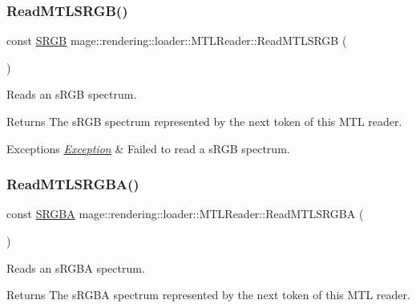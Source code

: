 \subsubsection{\texorpdfstring{Read\+M\+T\+L\+S\+R\+G\+B()}{ReadMTLSRGB()}}
{\footnotesize\ttfamily const \mbox{\hyperlink{structmage_1_1_s_r_g_b}{S\+R\+GB}} mage\+::rendering\+::loader\+::\+M\+T\+L\+Reader\+::\+Read\+M\+T\+L\+S\+R\+GB (\begin{DoxyParamCaption}{ }\end{DoxyParamCaption})\hspace{0.3cm}{\ttfamily [private]}}

Reads an s\+R\+GB spectrum.

\begin{DoxyReturn}{Returns}
The s\+R\+GB spectrum represented by the next token of this M\+TL reader. 
\end{DoxyReturn}

\begin{DoxyExceptions}{Exceptions}
{\em \mbox{\hyperlink{classmage_1_1_exception}{Exception}}} & Failed to read a s\+R\+GB spectrum. \\
\hline
\end{DoxyExceptions}
\mbox{\label{classmage_1_1rendering_1_1loader_1_1_m_t_l_reader_a5b03c5c7aee393e60ea6c3bd7ff15614}} 
\subsubsection{\texorpdfstring{Read\+M\+T\+L\+S\+R\+G\+B\+A()}{ReadMTLSRGBA()}}
{\footnotesize\ttfamily const \mbox{\hyperlink{structmage_1_1_s_r_g_b_a}{S\+R\+G\+BA}} mage\+::rendering\+::loader\+::\+M\+T\+L\+Reader\+::\+Read\+M\+T\+L\+S\+R\+G\+BA (\begin{DoxyParamCaption}{ }\end{DoxyParamCaption})\hspace{0.3cm}{\ttfamily [private]}}

Reads an s\+R\+G\+BA spectrum.

\begin{DoxyReturn}{Returns}
The s\+R\+G\+BA spectrum represented by the next token of this M\+TL reader. 
\end{DoxyReturn}

